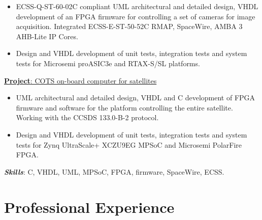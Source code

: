\documentclass[letterpaper]{twentysecondcv} %
\begin{document}
\begin{twenty}
{            \vspace{2 mm}
            \begin{itemize}
                \item ECSS-Q-ST-60-02C compliant UML architectural and detailed design, VHDL development of an FPGA firmware for controlling a set of cameras for image acquisition. Integrated ECSS-E-ST-50-52C RMAP, SpaceWire, AMBA 3 AHB-Lite IP Cores.
                \item Design and VHDL development of unit tests, integration tests and system tests for Microsemi proASIC3e and RTAX-S/SL platforms.
            \end{itemize}

            \vspace{2 mm}
            \underline{\textbf{Project}: COTS on-board computer for satellites}

            \vspace{2 mm}
            \begin{itemize}
                \item UML architectural and detailed design, VHDL and C development of FPGA firmware and software for the platform controlling the entire satellite. Working with the CCSDS 133.0-B-2 protocol.
                \item Design and VHDL development of unit tests, integration tests and system tests for Zynq UltraScale+ XCZU9EG MPSoC and Microsemi PolarFire FPGA.
            \end{itemize}

            \vspace{2 mm}
            \textbf{\textit{Skills}}: C, VHDL, UML, MPSoC, FPGA, firmware, SpaceWire, ECSS.
        }
\end{twenty}

\newpage
\makeextrainfo %

\section{Professional Experience}
\end{document}
